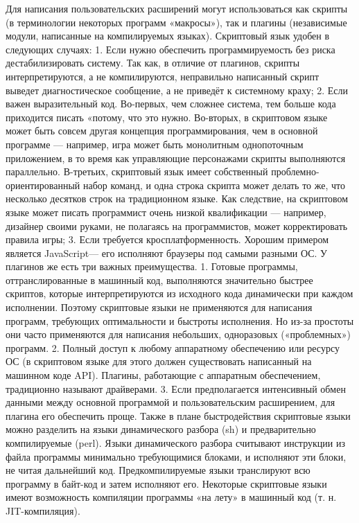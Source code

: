 
Для написания пользовательских расширений могут использоваться как скрипты (в терминологии некоторых программ «макросы»), так и плагины (независимые модули, написанные на компилируемых языках).
Скриптовый язык удобен в следующих случаях:
1.	Если нужно обеспечить программируемость без риска дестабилизировать систему. Так как, в отличие от плагинов, скрипты интерпретируются, а не компилируются, неправильно написанный скрипт выведет диагностическое сообщение, а не приведёт к системному краху;
2.	Если важен выразительный код. Во-первых, чем сложнее система, тем больше кода приходится писать «потому, что это нужно. Во-вторых, в скриптовом языке может быть совсем другая концепция программирования, чем в основной программе — например, игра может быть монолитным однопоточным приложением, в то время как управляющие персонажами скрипты выполняются параллельно. В-третьих, скриптовый язык имеет собственный проблемно-ориентированный набор команд, и одна строка скрипта может делать то же, что несколько десятков строк на традиционном языке. Как следствие, на скриптовом языке может писать программист очень низкой квалификации — например, дизайнер своими руками, не полагаясь на программистов, может корректировать правила игры;
3.	Если требуется кросплатформенность. Хорошим примером является JavaScript— его исполняют браузеры под самыми разными ОС.
У плагинов же есть три важных преимущества.
1.	Готовые программы, оттранслированные в машинный код, выполняются значительно быстрее скриптов, которые интерпретируются из исходного кода динамически при каждом исполнении. Поэтому скриптовые языки не применяются для написания программ, требующих оптимальности и быстроты исполнения. Но из-за простоты они часто применяются для написания небольших, одноразовых («проблемных») программ.
2.	Полный доступ к любому аппаратному обеспечению или ресурсу ОС (в скриптовом языке для этого должен существовать написанный на машинном коде API). Плагины, работающие с аппаратным обеспечением, традиционно называют драйверами.
3.	Если предполагается интенсивный обмен данными между основной программой и пользовательским расширением, для плагина его обеспечить проще.
Также в плане быстродействия скриптовые языки можно разделить на языки динамического разбора (sh) и предварительно компилируемые (perl). Языки динамического разбора считывают инструкции из файла программы минимально требующимися блоками, и исполняют эти блоки, не читая дальнейший код. Предкомпилируемые языки транслируют всю программу в байт-код и затем исполняют его. Некоторые скриптовые языки имеют возможность компиляции программы «на лету» в машинный код (т. н. JIT-компиляция).
